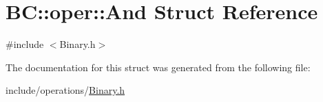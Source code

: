 \hypertarget{structBC_1_1oper_1_1And}{}\section{BC\+:\+:oper\+:\+:And Struct Reference}
\label{structBC_1_1oper_1_1And}


{\ttfamily \#include $<$Binary.\+h$>$}



The documentation for this struct was generated from the following file\+:\begin{DoxyCompactItemize}
\item 
include/operations/\hyperlink{Binary_8h}{Binary.\+h}\end{DoxyCompactItemize}
